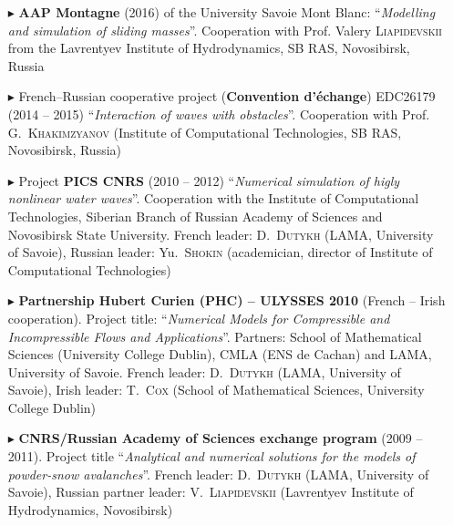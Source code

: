 \begin{itemize}
  \item[$\blacktriangleright$] \textbf{AAP Montagne} (2016) of the University Savoie Mont Blanc: ``\textit{Modelling and simulation of sliding masses}''. Cooperation with Prof. Valery \textsc{Liapidevskii} from the Lavrentyev Institute of Hydrodynamics, SB RAS, Novosibirsk, Russia
  \item[$\blacktriangleright$] French--Russian cooperative project (\textbf{Convention d'\'echange}) \No EDC26179 (2014 -- 2015) ``\textit{Interaction of waves with obstacles}''. Cooperation with Prof. G.~\textsc{Khakimzyanov} (Institute of Computational Technologies, SB RAS, Novosibirsk, Russia)
	\item[$\blacktriangleright$] Project \textbf{PICS CNRS} (2010 -- 2012) ``\textit{Numerical simulation of higly nonlinear water waves}''. Cooperation with the Institute of Computational Technologies, Siberian Branch of Russian Academy of Sciences and Novosibirsk State University. French leader: D.~\textsc{Dutykh} (LAMA, University of Savoie), Russian leader: Yu.~\textsc{Shokin} (academician, director of Institute of Computational Technologies)
	\item[$\blacktriangleright$] \textbf{Partnership Hubert Curien (PHC) -- ULYSSES 2010} (French -- Irish cooperation). Project title: ``\textit{Numerical Models for Compressible and Incompressible Flows and Applications}''. Partners: School of Mathematical Sciences (University College Dublin), CMLA (ENS de Cachan) and LAMA, University of Savoie. French leader: D.~\textsc{Dutykh} (LAMA, University of Savoie), Irish leader: T.~\textsc{Cox} (School of Mathematical Sciences, University College Dublin)
  \item[$\blacktriangleright$] \textbf{CNRS/Russian Academy of Sciences exchange program} (2009 -- 2011). Project title ``\textit{Analytical and numerical solutions for the models of powder-snow avalanches}''. French leader: D.~\textsc{Dutykh} (LAMA, University of Savoie), Russian partner leader: V.~\textsc{Liapidevskii} (Lavrentyev Institute of Hydrodynamics, Novosibirsk)
\end{itemize}

\separator
